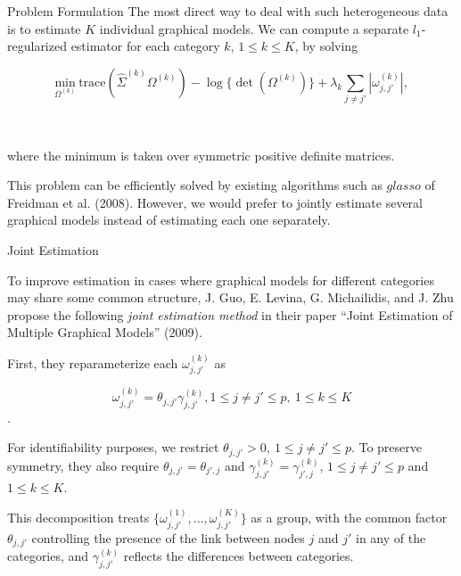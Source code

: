 \documentclass[t]{beamer}
\begin{document}
   \begin{frame}{Problem Formulation}
   The most direct way to deal with such heterogeneous data is to estimate $K$ individual
    graphical models. We can compute a separate $l_1$-regularized estimator for each category $k$,
   $ 1 \leq k \leq K$, by solving
   

\begin{equation*}
     \underset{\Omega^{(k)}}{\mbox{min}} \  \mbox{trace} (\hat{\Sigma}^{(k)} \Omega^{(k)}) - \log\{ \det(\Omega^{(k)})\} + \lambda_k \sum_{j \neq j'} |\omega_{j,j'}^{(k)}|,
\end{equation*}
    
    \
     
     where the minimum is taken over symmetric positive definite matrices.
     
     \bigskip
\pause
     
 This problem can be efficiently solved by existing algorithms such as $glasso$ of Freidman et al. (2008). However, we would prefer to jointly estimate several graphical models instead of estimating each one separately.
       
   \end{frame}
   
    \begin{frame}{Joint Estimation}
      
      To improve estimation in cases where graphical models for different categories may share
      some common structure, J. Guo, E. Levina, G. Michailidis, and J. Zhu propose the following \textit{joint estimation method} in their paper ``Joint Estimation of Multiple Graphical Models'' (2009).
      
      \bigskip
\pause
      
       First, they reparameterize each $\omega_{j,j'}^{(k)}$  as
      
      \begin{equation*}
     \omega_{j,j'}^{(k)} = \theta_{j,j'} \gamma_{j,j'}^{(k)}, 1\leq j \neq j' \leq p, \ 1\leq k \leq K 
\end{equation*}.

      \bigskip
\pause
      For identifiability purposes, we restrict $\theta_{j,j'} > 0, \ 1\leq j \neq j' \leq p$. To preserve symmetry, they also require $\theta_{j,j'} = \theta_{j',j}$ and $\gamma_{j,j'}^{(k)} = \gamma_{j',j}^{(k)}$, $1 \leq j \neq j' \leq p$ and $1 \leq k \leq K$.
      
      \bigskip
\pause
      
       This decomposition treats $\{ \omega_{j,j'}^{(1)},...,\omega_{j,j'}^{(K)} \}$ as a group, with the common factor $\theta_{j,j'}$ controlling the presence of the link between nodes $j$ and $j'$ in any of the categories, and $\gamma_{j,j'}^{(k)}$ reflects the differences between categories. 
      
      \end{frame}
\end{document}
